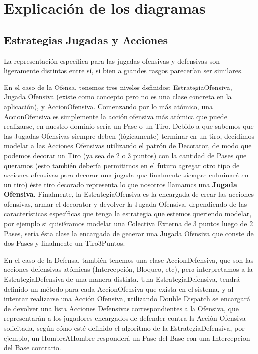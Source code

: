 \section{Explicación de los diagramas}

\subsection{Estrategias Jugadas y Acciones}

La representación específica para las jugadas ofensivas y defensivas son ligeramente distintas entre sí, si bien a grandes rasgos parecerían ser similares.

En el caso de la Ofensa, tenemos tres niveles definidos: EstrategiaOfensiva, Jugada Ofensiva (existe como concepto pero no es una clase concreta en la aplicación), y AccionOfensiva. Comenzando por lo más atómico, una AccionOfensiva es simplemente la acción ofensiva más atómica que puede realizarse, en nuestro dominio sería un Pase o un Tiro. Debido a que sabemos que las Jugadas Ofensivas siempre deben (lógicamente) terminar en un tiro, decidimos modelar a las Acciones Ofensivas utilizando el patrón de Decorator, de modo que podemos decorar un Tiro (ya sea de 2 o 3 puntos) con la cantidad de Pases que queramos (esto también debería permitirnos en el futuro agregar otro tipo de acciones ofensivas para decorar una jugada que finalmente siempre culminará en un tiro) éste tiro decorado representa lo que nosotros llamamos una \textbf{Jugada Ofensiva}. Finalmente, la EstrategiaOfensiva es la encargada de crear las acciones ofensivas, armar el decorator y devolver la Jugada Ofensiva, dependiendo de las características específicas que tenga la estrategia que estemos queriendo modelar, por ejemplo si quisiéramos modelar una Colectiva Externa de 3 puntos luego de 2 Pases, sería ésta clase la encargada de generar una Jugada Ofensiva que conste de dos Pases y finalmente un Tiro3Puntos.

En el caso de la Defensa, también tenemos una clase AccionDefensiva, que son las acciones defensivas atómicas (Intercepción, Bloqueo, etc), pero interpretamos a la EstrategiaDefensiva de una manera distinta. Una EstrategiaDefensiva, tendrá definido un método para cada AccionOfensiva que exista en el sistema, y al intentar realizarse una Acción Ofensiva, utilizando Double Dispatch se encargará de devolver una lista Acciones Defensivas correspondientes a la Ofensiva, que representarán a los jugadores encargados de defender contra la Acción Ofensiva solicitada, según cómo esté definido el algoritmo de la EstrategiaDefensiva, por ejemplo, un HombreAHombre responderá un Pase del Base con una Intercepcion del Base contrario.

